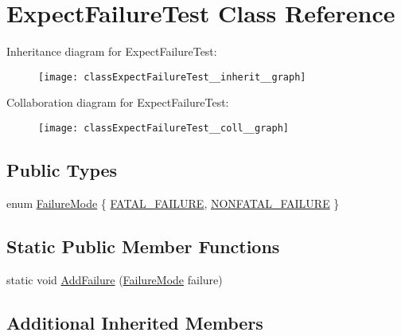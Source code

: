 \hypertarget{classExpectFailureTest}{}\section{Expect\+Failure\+Test Class Reference}
\label{classExpectFailureTest}


Inheritance diagram for Expect\+Failure\+Test\+:\nopagebreak
\begin{figure}[H]
\begin{center}
\leavevmode
\texttt{[image: classExpectFailureTest\_\_inherit\_\_graph]}
\end{center}
\end{figure}


Collaboration diagram for Expect\+Failure\+Test\+:\nopagebreak
\begin{figure}[H]
\begin{center}
\leavevmode
\texttt{[image: classExpectFailureTest\_\_coll\_\_graph]}
\end{center}
\end{figure}
\subsection*{Public Types}
\begin{DoxyCompactItemize}
\item 
enum \hyperlink{classExpectFailureTest_aad05da10bb15d21a434eba3b37011406}{Failure\+Mode} \{ \hyperlink{classExpectFailureTest_aad05da10bb15d21a434eba3b37011406a3d618496b7e2a2c256e02186bddee4ec}{F\+A\+T\+A\+L\+\_\+\+F\+A\+I\+L\+U\+RE}, 
\hyperlink{classExpectFailureTest_aad05da10bb15d21a434eba3b37011406aeabdbecc0c4550d4f46cd44ac62fb92b}{N\+O\+N\+F\+A\+T\+A\+L\+\_\+\+F\+A\+I\+L\+U\+RE}
 \}
\end{DoxyCompactItemize}
\subsection*{Static Public Member Functions}
\begin{DoxyCompactItemize}
\item 
static void \hyperlink{classExpectFailureTest_ab9aeb7820ff7953fc2975ecc5abd046b}{Add\+Failure} (\hyperlink{classExpectFailureTest_aad05da10bb15d21a434eba3b37011406}{Failure\+Mode} failure)
\end{DoxyCompactItemize}
\subsection*{Additional Inherited Members}


